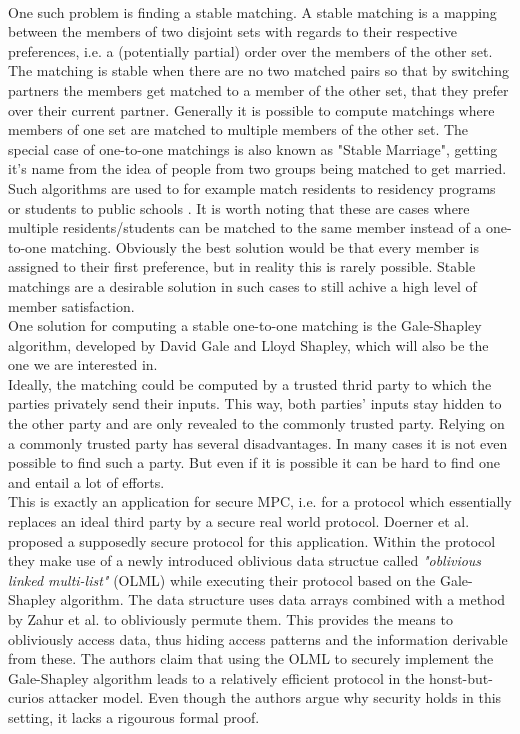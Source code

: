 \ \\One such problem is finding a stable matching. A stable matching is a mapping between the members of two disjoint sets with regards to their respective preferences, i.e. a (potentially partial) order over the members of the other set. The matching is stable when there are no two matched pairs so that by switching partners the members get matched to a member of the other set, that they prefer over their current partner. Generally it is possible to compute matchings where members of one set are matched to multiple members of the other set. The special case of one-to-one matchings is also known as "Stable Marriage", getting it's name from the idea of people from two groups being matched to get married.\\ 
Such algorithms are used to for example match residents to residency programs \citep{nrmp} or students to public schools \citep{sm}. It is worth noting that these are cases where multiple  residents/students can be matched to the same member instead of a one-to-one matching. Obviously the best solution would be that every member is assigned to their first preference, but in reality this is rarely possible. Stable matchings are a desirable solution in such cases to still achive a high level of member satisfaction.\\
One solution for computing a stable one-to-one matching is the Gale-Shapley algorithm, developed by David Gale and Lloyd Shapley, which will also be the one we are interested in.\\ 
Ideally, the matching could be computed by a trusted thrid party to which the parties privately send their inputs. This way, both parties' inputs stay hidden to the other party and are only revealed to the commonly trusted party.
Relying on a commonly trusted party has several disadvantages. In many cases it is not even possible to find such a party. But even if it is possible it can be hard to find one and entail a lot of efforts. \\
This is exactly an application for secure MPC, i.e. for a protocol which essentially replaces an ideal third party by a secure real world protocol. Doerner et al. \citep{smas} proposed a supposedly secure protocol for this application. Within the protocol they make use of a newly introduced oblivious data structue called \emph{"oblivious linked multi-list"} (OLML) while executing their protocol based on the Gale-Shapley algorithm. The data structure uses data arrays combined with a method by Zahur et al. \citep{rsqo} to obliviously permute them. This provides the means to obliviously access data, thus hiding access patterns and the information derivable from these. The authors claim that using the OLML to securely implement the Gale-Shapley algorithm leads to a relatively efficient protocol in the honst-but-curios attacker model. Even though the authors argue why security holds in this setting, it lacks a rigourous formal proof.\\